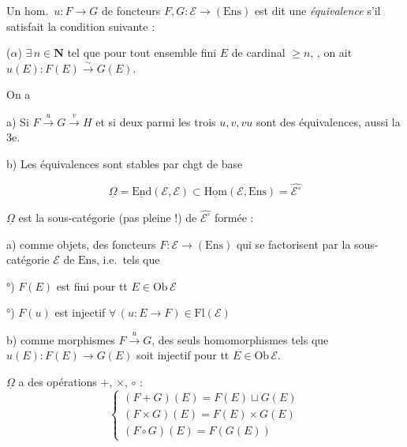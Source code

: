 \documentclass[11pt,a4paper]{article}
\begin{document}

Un hom.\ $u : F \to G$ de foncteurs $F, G : \mathcal{E} \to
(\mathrm{Ens})$ est dit une \emph{équivalence} s'il satisfait la condition
suivante :

($\alpha$) $\exists\, n \in \mathbf{N}$ tel que pour  tout
ensemble fini $E$ \struck{\ill{}} de cardinal $\geqslant n$,
, on ait
$u(E) : F(E) \xrightarrow{\sim} G(E)$.

On a

a) Si $F \xrightarrow{u} G \xrightarrow{v} H$ et si deux parmi les trois
$u, v, vu$ sont des équivalences, aussi la 3e.

b) L\struck{\ill{}}es équivalences sont stables par chgt de base

\[
  \underline{\Omega} = \underline{\mathrm{End}}(\mathcal{E}, \mathcal{E})
  \subset \underline{\mathrm{Hom}}(\mathcal{E}, \mathrm{Ens}) =
  \widehat{\mathcal{E}^{\circ}}
\]

$\underline{\Omega}$ est la sous-catégorie (pas pleine !) de
$\widehat{\mathcal{E}^{\circ}}$ formée :

a) comme objets, des foncteurs $F : \mathcal{E} \to (\mathrm{Ens})$ qui se
factorisent par la sous-catégorie $\mathcal{E}$ de $\mathrm{Ens}$, i.e.\ tels
que

°) $F(E)$ est fini pour tt $E \in \mathrm{Ob}\,\mathcal{E}$

°) $F(u)$ est injectif $\forall\, (u : E \to F) \in
\mathrm{Fl}(\mathcal{E})$

b) comme morphismes $F \xrightarrow{u} G$, des seuls homomorphismes tels que
$u(E) : F(E) \to G(E)$ soit injectif pour tt $E \in \mathrm{Ob}\,\mathcal{E}$.

$\underline{\Omega}$ a des opérations $+$, $\times$, $\circ$ :
\[
  \begin{cases}
    (F + G)(E) = F(E) \sqcup G(E) \\
    (F \times G)(E) = F(E) \times G(E) \\
    (F \circ G)(E) = F(G(E))
  \end{cases}
\]
\end{document}
